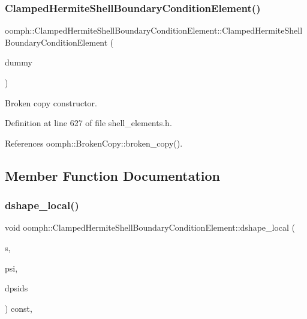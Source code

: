 \subsubsection{\texorpdfstring{Clamped\+Hermite\+Shell\+Boundary\+Condition\+Element()}{ClampedHermiteShellBoundaryConditionElement()}\hspace{0.1cm}{\footnotesize\ttfamily [3/3]}}
{\footnotesize\ttfamily oomph\+::\+Clamped\+Hermite\+Shell\+Boundary\+Condition\+Element\+::\+Clamped\+Hermite\+Shell\+Boundary\+Condition\+Element (\begin{DoxyParamCaption}\item[{const \hyperlink{classoomph_1_1ClampedHermiteShellBoundaryConditionElement}{Clamped\+Hermite\+Shell\+Boundary\+Condition\+Element} \&}]{dummy }\end{DoxyParamCaption})\hspace{0.3cm}{\ttfamily [inline]}}



Broken copy constructor. 



Definition at line 627 of file shell\+\_\+elements.\+h.



References oomph\+::\+Broken\+Copy\+::broken\+\_\+copy().



\subsection{Member Function Documentation}
\mbox{\label{classoomph_1_1ClampedHermiteShellBoundaryConditionElement_aa7324ef347e70cfa0828fa7c82074398}} 
\subsubsection{\texorpdfstring{dshape\+\_\+local()}{dshape\_local()}}
{\footnotesize\ttfamily void oomph\+::\+Clamped\+Hermite\+Shell\+Boundary\+Condition\+Element\+::dshape\+\_\+local (\begin{DoxyParamCaption}\item[{const \hyperlink{classoomph_1_1Vector}{Vector}$<$ double $>$ \&}]{s,  }\item[{\hyperlink{classoomph_1_1Shape}{Shape} \&}]{psi,  }\item[{\hyperlink{classoomph_1_1DShape}{D\+Shape} \&}]{dpsids }\end{DoxyParamCaption}) const\hspace{0.3cm}{\ttfamily [inline]}, {\ttfamily [virtual]}}



